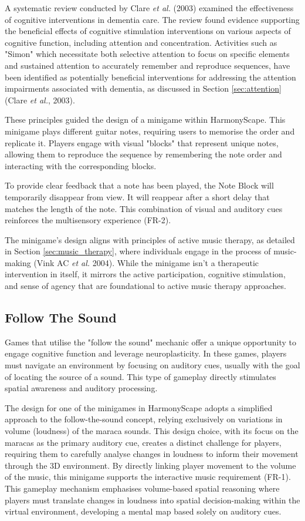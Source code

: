 \documentclass{l4proj}
\begin{document}
A systematic review conducted by Clare \emph{et al.} (2003) examined the effectiveness of cognitive interventions in dementia care. The review found evidence supporting the beneficial effects of cognitive stimulation interventions on various aspects of cognitive function, including attention and concentration. Activities such as "Simon" which necessitate both selective attention to focus on specific elements and sustained attention to accurately remember and reproduce sequences, have been identified as potentially beneficial interventions for addressing the attention impairments associated with dementia, as discussed in Section \ref{sec:attention} (Clare \emph{et al.}, 2003).

These principles guided the design of a minigame within HarmonyScape. This minigame plays different guitar notes, requiring users to memorise the order and replicate it. Players engage with visual "blocks" that represent unique notes, allowing them to reproduce the sequence by remembering the note order and interacting with the corresponding blocks.

To provide clear feedback that a note has been played, the Note Block will temporarily disappear from view. It will reappear after a short delay that matches the length of the note. This combination of visual and auditory cues reinforces the multisensory experience (FR-2).

The minigame's design aligns with principles of active music therapy, as detailed in Section \ref{sec:music_therapy}, where individuals engage in the process of music-making (Vink AC \emph{et al.} 2004).  While the minigame isn't a therapeutic intervention in itself, it mirrors the active participation, cognitive stimulation, and sense of agency that are foundational to active music therapy approaches.

\subsection{Follow The Sound}
Games that utilise the "follow the sound" mechanic offer a unique opportunity to engage cognitive function and leverage neuroplasticity. In these games, players must navigate an environment by focusing on auditory cues, usually with the goal of locating the source of a sound. This type of gameplay directly stimulates spatial awareness and auditory processing.

The design for one of the minigames in HarmonyScape adopts a simplified approach to the follow-the-sound concept, relying exclusively on variations in volume (loudness) of the maraca sounds. This design choice, with its focus on the maracas as the primary auditory cue, creates a distinct challenge for players, requiring them to carefully analyse changes in loudness to inform their movement through the 3D environment. By directly linking player movement to the volume of the music, this minigame supports the interactive music requirement (FR-1). This gameplay mechanism emphasises volume-based spatial reasoning where players must translate changes in loudness into spatial decision-making within the virtual environment, developing a mental map based solely on auditory cues.
\end{document}
